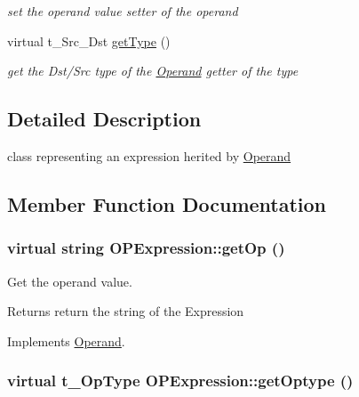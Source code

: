 \begin{DoxyCompactItemize}
\begin{DoxyCompactList}\small\item\em set the operand value setter of the operand \item\end{DoxyCompactList}\item 
\hypertarget{classOPExpression_accdf986185c7d8261a53bd4ec00370fc}{
virtual t\_\-Src\_\-Dst \hyperlink{classOPExpression_accdf986185c7d8261a53bd4ec00370fc}{getType} ()}
\label{classOPExpression_accdf986185c7d8261a53bd4ec00370fc}

\begin{DoxyCompactList}\small\item\em get the Dst/Src type of the \hyperlink{classOperand}{Operand} getter of the type \item\end{DoxyCompactList}\end{DoxyCompactItemize}


\subsection{Detailed Description}
class representing an expression herited by \hyperlink{classOperand}{Operand} 

\subsection{Member Function Documentation}
\hypertarget{classOPExpression_a7b095019f9c2138f1f6bfd21bf4348d9}{
\subsubsection[{getOp}]{\setlength{\rightskip}{0pt plus 5cm}virtual string OPExpression::getOp ()}}
\label{classOPExpression_a7b095019f9c2138f1f6bfd21bf4348d9}


Get the operand value. \begin{DoxyReturn}{Returns}
return the string of the Expression 
\end{DoxyReturn}


Implements \hyperlink{classOperand_a8cf27955648cbf07144abf4e5a77c266}{Operand}.\hypertarget{classOPExpression_a26efe8d14f0d37157c885ff16988be30}{
\subsubsection[{getOptype}]{\setlength{\rightskip}{0pt plus 5cm}virtual t\_\-OpType OPExpression::getOptype ()}}
\label{classOPExpression_a26efe8d14f0d37157c885ff16988be30}


